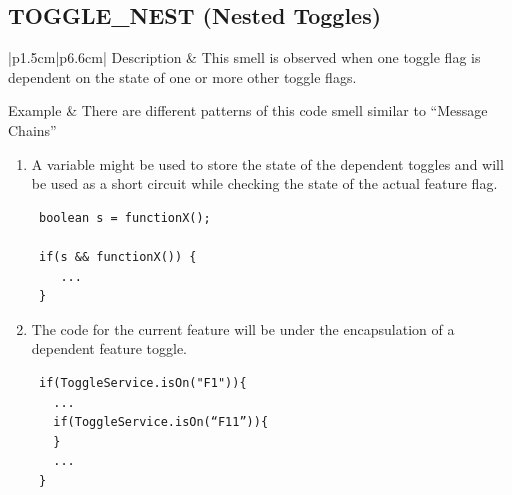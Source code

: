 \documentclass[conference]{IEEEtran}
\begin{document}
\begin{table}[ht]
\begin{tabular}{|p{1.5cm}|p{7cm}|}
 \\ \hline
\end{tabular}
\label{table:dead-toggle}
\end{table}

\subsection{TOGGLE\_NEST (Nested Toggles)}
\begin{table}[!htbp]
\caption{Nested Toggle Smell}
\centering
\begin{tabular}{|p{1.5cm}|p{6.6cm}|}
\hline\hline
 Description & This smell is observed when one toggle flag is dependent on the state of one or more other toggle flags. \\ \hline

 Example & There are different patterns of this code smell similar to ``Message Chains''
 \begin{enumerate}
 \item{A variable might be used to store the state of the dependent toggles and will be used as a short circuit while checking the state of the actual feature flag.
 \begin{lstlisting} 
 boolean s = functionX();

 if(s && functionX()) {
    ...
 }
 \end{lstlisting}
 }
 
 \item{The code for the current feature will be under the encapsulation of a dependent feature toggle.
 \begin{lstlisting}
 if(ToggleService.isOn("F1")){
   ...
   if(ToggleService.isOn(“F11”)){
   }
   ...
 }
 \end{lstlisting}
 }
 \end{enumerate}
 
 \\ \hline
 

\end{tabular}
\end{table}
\end{document}
